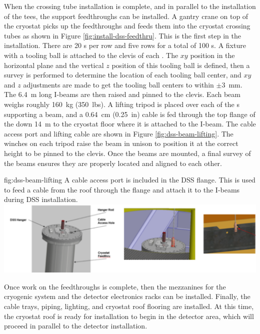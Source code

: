 When the crossing tube installation is complete, and in parallel to the installation of the  tees, the  support feedthroughs can be installed. A gantry crane on top of the cryostat picks up the feedthroughs and feeds them into the cryostat crossing tubes as shown in Figure \ref{fig:install-dss-feedthru}.
This is the first step in the  installation.
There are \num{20} \fdth{}s per row and five rows for a total of \num{100} \fdth{}s.  
A fixture with a tooling ball is attached to the
clevis of each \fdth.  
The $xy$ position in the horizontal plane
and the vertical $z$ position of this tooling ball is defined, then a  survey is performed to determine the location of each tooling ball center, and $xy$ and $z$ adjustments are made to get the tooling
ball centers to within $\pm$\SI{3}{mm}.  
The \SI{6.4}{m} long I-beams are then raised and pinned to the clevis.  Each beam weighs roughly \SI{160}{kg} (\SI{350}{lbs}).
A lifting tripod is placed over each of the \fdth{}s supporting a beam, and a \SI{0.64}{cm} (\SI{0.25}{in})  %
cable is fed through the top flange of the \fdth down \SI{14}{m} to the cryostat floor where it is attached to the I-beam. The cable access port and lifting cable are shown in Figure \ref{fig:dss-beam-lifting}. 
The winches on each tripod raise the beam in unison to position it at the correct height to be pinned to the \fdth clevis.  
Once the beams are mounted, a final survey of the beams ensures they are properly located and aligned to each other.

 \begin{dunefigure}{fig:dss-beam-lifting}
  {A cable access port is included in the DSS flange. This is used to feed a cable from the roof through the flange and attach it to the I-beams during DSS installation.}
 \includegraphics[width=.95\textwidth]{graphics/dss-beam-lifting.pdf}
\end{dunefigure}

Once work on the feedthroughs is complete, then the mezzanines for the cryogenic system and the detector electronics racks can be installed. Finally, the cable trays,  piping, lighting, and cryostat roof flooring are installed. 
At this time, the cryostat roof is ready for  installation to begin in the detector area, which will proceed in parallel to the detector installation.

